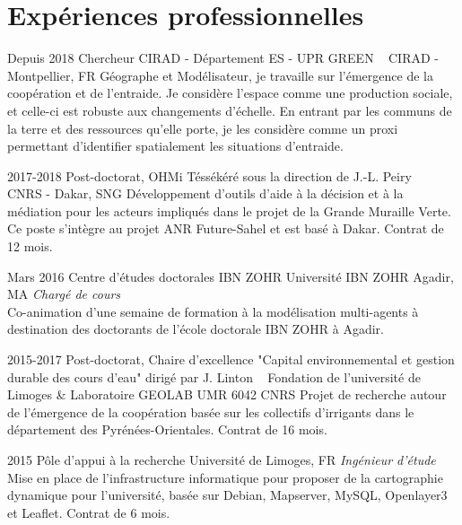 \documentclass[]{cv-etienne}
\begin{document}
\section{Expériences professionnelles}
\begin{entrylist}
\entry
{Depuis 2018}
{Chercheur CIRAD - Département ES - UPR GREEN ~}
{CIRAD - Montpellier, FR}
{Géographe et Modélisateur, je travaille sur l'émergence de la coopération et de l'entraide. Je considère l'espace comme une production sociale, et celle-ci est robuste aux changements d'échelle. En entrant par les communs de la terre et des ressources qu'elle porte, je les considère comme un proxi permettant d'identifier spatialement les situations d'entraide.}
\end{entrylist}
\begin{entrylist}
\entry
{2017-2018}
{Post-doctorat, OHMi Téssékéré  {\normalfont sous la direction de J.-L. Peiry} ~}
{CNRS - Dakar, SNG}
{Développement d'outils d'aide à la décision et à la médiation pour les acteurs impliqués dans le projet de la Grande Muraille Verte. Ce poste s'intègre au projet ANR Future-Sahel et est basé à Dakar. Contrat de 12 mois.}
\end{entrylist}
\begin{entrylist}
\entry
{Mars 2016}
{Centre d'études doctorales IBN ZOHR}
{Université IBN ZOHR Agadir, MA}
{\emph{Chargé de cours} \\
Co-animation d'une semaine de formation à la modélisation multi-agents à destination des doctorants de l'école doctorale IBN ZOHR à Agadir.
}
\end{entrylist}
\begin{entrylist}
\entry
{2015-2017}
{Post-doctorat, Chaire d'excellence "Capital environnemental et gestion durable des cours d'eau"  {\normalfont dirigé par J. Linton} ~}
{Fondation de l'université de Limoges \& Laboratoire GEOLAB UMR 6042 CNRS}
{Projet de recherche autour de l'émergence de la coopération basée sur les collectifs d'irrigants dans le département des Pyrénées-Orientales. Contrat de 16 mois.}
\end{entrylist}
\begin{entrylist}
\entry
{2015}
{Pôle d'appui à la recherche}
{Université de Limoges, FR}
{\emph{Ingénieur d'étude} \\
Mise en place de l'infrastructure informatique pour proposer de la cartographie dynamique pour l'université, basée sur Debian, Mapserver, MySQL, Openlayer3 et Leaflet. Contrat de 6 mois.
}
\end{entrylist}
\end{document}
